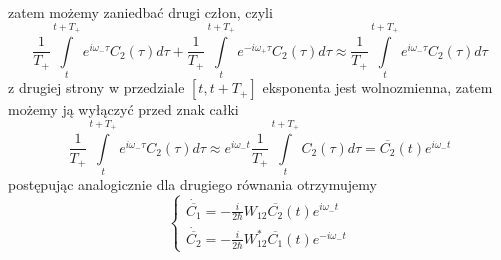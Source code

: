 \documentclass[a4paper,12pt]{article}
\begin{document}
	zatem możemy zaniedbać drugi człon, czyli
	$$
	\frac{1}{T_+}\int\limits_t^{t+T_+}e^{i\omega_{-}\tau}C_2(\tau)d\tau + \frac{1}{T_+}\int\limits_t^{t+T_+}e^{-i\omega_{+}\tau}C_2(\tau)d\tau \approx
	\frac{1}{T_+}\int\limits_t^{t+T_+}e^{i\omega_{-}\tau}C_2(\tau)d\tau
	$$
	z drugiej strony w przedziale $[t,t+T_+]$ eksponenta jest wolnozmienna, zatem możemy ją wyłączyć przed znak całki
	$$
	\frac{1}{T_+}\int\limits_t^{t+T_+}e^{i\omega_{-}\tau}C_2(\tau)d\tau \approx e^{i\omega_{-}t}\frac{1}{T_+}\int\limits_t^{t+T_+}C_2(\tau)d\tau  = \overline{C_2}(t)e^{i\omega_{-}t}
	$$
	postępując analogicznie dla drugiego równania otrzymujemy
	$$
	\left\{\begin{gathered}
		\dot{\overline{C_1}} = -\frac{i}{2\hbar}W_{12} \overline{C_2}(t)e^{i\omega_{-}t}\\
		\dot{\overline{C_2}} =  -\frac{i}{2\hbar}W_{12}^* \overline{C_1}(t)e^{-i\omega_{-}t}
	\end{gathered} \right.
	$$
\end{document}
